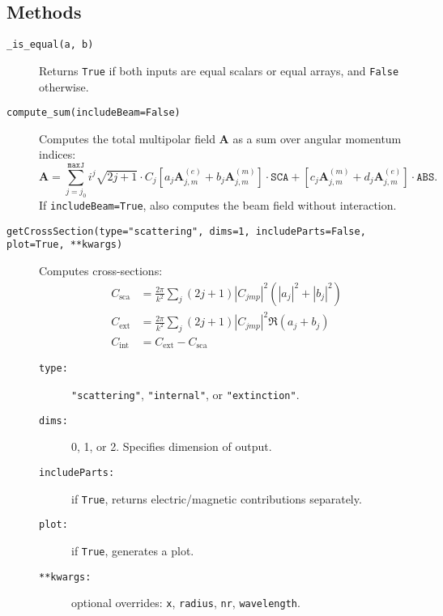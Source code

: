 \subsection{Methods}
\begin{description}
    \item[\texttt{\_is\_equal(a, b)}]
    Returns \texttt{True} if both inputs are equal scalars or equal arrays, and \texttt{False} otherwise.

    \item[\texttt{compute\_sum(includeBeam=False)}]
    Computes the total multipolar field \( \mathbf{A} \) as a sum over angular momentum indices:
    \begin{equation}
        \mathbf{A} = \sum_{j=j_0}^{\texttt{maxJ}} i^j \sqrt{2j+1} \cdot C_j \left[ a_j \mathbf{A}_{j,m}^{(e)} + b_j \mathbf{A}_{j,m}^{(m)} \right] \cdot \texttt{SCA} + \left[ c_j \mathbf{A}_{j,m}^{(m)} + d_j \mathbf{A}_{j,m}^{(e)} \right] \cdot \texttt{ABS}.
    \end{equation}
    If \texttt{includeBeam=True}, also computes the beam field without interaction.

    \item[\texttt{getCrossSection(type="scattering", dims=1, includeParts=False, plot=True, **kwargs)}]
    Computes cross-sections:
    \begin{equation}
    \begin{split}
        C_{\text{sca}} &= \frac{2\pi}{k^2} \sum_j (2j+1) |C_{j m p}|^2 \left( |a_j|^2 + |b_j|^2 \right) \\
        C_{\text{ext}} &= \frac{2\pi}{k^2} \sum_j (2j+1) |C_{j m p}|^2 \Re(a_j + b_j) \\
        C_{\text{int}} &= C_{\text{ext}} - C_{\text{sca}}
    \end{split}
    \end{equation}
    \begin{description}
        \item[\texttt{type:}] \texttt{"scattering"}, \texttt{"internal"}, or \texttt{"extinction"}.
        \item[\texttt{dims:}] 0, 1, or 2. Specifies dimension of output.
        \item[\texttt{includeParts:}] if \texttt{True}, returns electric/magnetic contributions separately.
        \item[\texttt{plot:}] if \texttt{True}, generates a plot.
        \item[\texttt{**kwargs:}] optional overrides: \texttt{x}, \texttt{radius}, \texttt{nr}, \texttt{wavelength}.
    \end{description}


\end{description}
